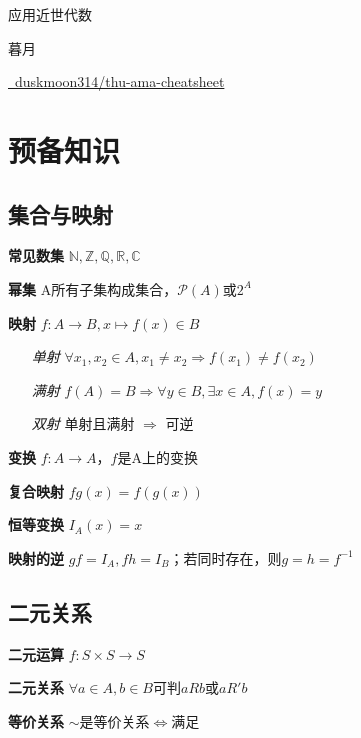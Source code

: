 \documentclass[a4paper,10pt]{ctexart}
\newcommand*{\setN}{\mathbb{N}}
\newcommand*{\setZ}{\mathbb{Z}}
\newcommand*{\setQ}{\mathbb{Q}}
\newcommand*{\setR}{\mathbb{R}}
\newcommand*{\setC}{\mathbb{C}}
\newcommand*{\powerset}[1]{\mathscr{P}(#1)}
\newcommand*{\impl}{\Rightarrow}
\renewcommand*{\iff}{\Leftrightarrow}
\begin{document}
\begin{multicols}{3}
    \begin{center}
        {\Large 应用近世代数}

        暮月

        \href{https://github.com/duskmoon314/thu-ama-cheatsheet}{\faGithub \  duskmoon314/thu-ama-cheatsheet}
    \end{center}

    \section{预备知识}

    \subsection{集合与映射}

    \textbf{常见数集} $\setN, \setZ, \setQ, \setR, \setC$

    \textbf{幂集} A所有子集构成集合，$\powerset{A}$或$2^A$

    \textbf{映射} $f: A \to B, x \mapsto f(x) \in B$

    \begin{itemize}
        \item[\emph{单射}] $\forall x_1, x_2 \!\in\! A, x_1 \!\neq\! x_2 \!\impl\! f(x_1) \!\neq\! f(x_2) $
        \item[\emph{满射}] $f(A) \! = \! B \impl \forall y \!\in\! B, \exists x \!\in\! A, f(x) = y$
        \item[\emph{双射}] 单射且满射 $\impl$ 可逆
    \end{itemize}

    \textbf{变换} $f: A \to A$，$f$是A上的变换

    \textbf{复合映射} $fg(x) = f(g(x))$

    \textbf{恒等变换} $I_A(x) = x$

    \textbf{映射的逆} $gf=I_A, fh=I_B$；若同时存在，则$g=h=f^{-1}$

    \subsection{二元关系}

    \textbf{二元运算} $f: S \times S \to S$

    \textbf{二元关系} $\forall a \!\in\! A, b \!\in\! B$可判$\!aRb\!$或$\!aR'b\!$

    \textbf{等价关系} $\sim$是等价关系$\iff$满足


\end{multicols}
\end{document}
